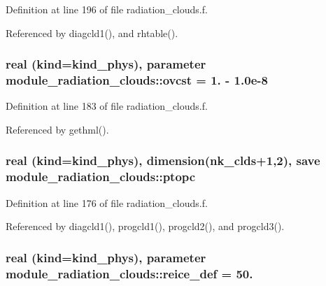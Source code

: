 Definition at line 196 of file radiation\+\_\+clouds.\+f.



Referenced by diagcld1(), and rhtable().

\subsubsection[{\texorpdfstring{ovcst}{ovcst}}]{\setlength{\rightskip}{0pt plus 5cm}real (kind=kind\+\_\+phys), parameter module\+\_\+radiation\+\_\+clouds\+::ovcst = 1. -\/ 1.\+0e-\/8\hspace{0.3cm}{\ttfamily [private]}}\hypertarget{group__module__radiation__clouds_ga5667082e13ef37593bdfcc152e3dd449}{}\label{group__module__radiation__clouds_ga5667082e13ef37593bdfcc152e3dd449}


Definition at line 183 of file radiation\+\_\+clouds.\+f.



Referenced by gethml().

\subsubsection[{\texorpdfstring{ptopc}{ptopc}}]{\setlength{\rightskip}{0pt plus 5cm}real (kind=kind\+\_\+phys), dimension(nk\+\_\+clds+1,2), save module\+\_\+radiation\+\_\+clouds\+::ptopc\hspace{0.3cm}{\ttfamily [private]}}\hypertarget{group__module__radiation__clouds_ga03bc5d19cbdc84a2032c8d591ba4c96a}{}\label{group__module__radiation__clouds_ga03bc5d19cbdc84a2032c8d591ba4c96a}


Definition at line 176 of file radiation\+\_\+clouds.\+f.



Referenced by diagcld1(), progcld1(), progcld2(), and progcld3().

\subsubsection[{\texorpdfstring{reice\+\_\+def}{reice_def}}]{\setlength{\rightskip}{0pt plus 5cm}real (kind=kind\+\_\+phys), parameter module\+\_\+radiation\+\_\+clouds\+::reice\+\_\+def = 50.\hspace{0.3cm}{\ttfamily [private]}}\hypertarget{group__module__radiation__clouds_ga721e0fb4a34774f5b61f567b9cad8e7b}{}\label{group__module__radiation__clouds_ga721e0fb4a34774f5b61f567b9cad8e7b}


